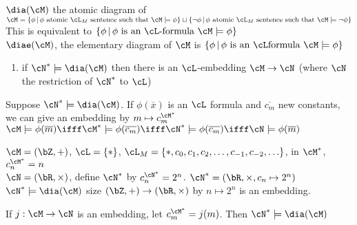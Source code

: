 \begin{definition}
   $\dia(\cM)$ the atomic diagram of $\cM = \{ \phi \, | \, \phi \text{ atomic } \cL_M \text{ sentence such that } \cM \models \phi \} \cup \{ \neg \phi \, | \, \phi \text{ atomic } \cL_M \text{ sentence such that }\cM \models \neg \phi \}$\\ 
   This is equivalent to $\{ \phi \, | \, \phi \text{ is an } \cL\text{-formula } \cM \models \phi\}$ \\
   $\diae(\cM)$, the elementary diagram of $\cM$ is $\{ \phi \, | \, \phi \text{ is an } \cL \text{formula } \cM \models \phi\}$  
\end{definition}

\begin{lemma}
    \begin{enumerate}[label = (\roman*)]
        \item if $\cN^* \models \dia(\cM)$ then there is an $\cL$-embedding $\cM \to \cN$ (where $\cN$ the restriction of $\cN^*$ to $\cL$)
    \end{enumerate}
\end{lemma}

\begin{pf}
    Suppose $\cN^* \models \dia(\cM)$. If $\phi(\overline{x})$ is an $\cL$ formula and $\overline{c_m}$ new constants, we can give an embedding by $m \mapsto c_m^{\cM^*}$ \\ 
    $\cM \models \phi(\overline{m}) \ifff \cM^* \models \phi(\overline{c_m}) \ifff \cN^* \models \phi(\overline{c_m}) \ifff \cN \models \phi(\overline{m})$ 
\end{pf}

\begin{example}
    $\cM = (\bZ, +)$, $\cL = \{*\}$, $\cL_M = \{*, c_0, c_1, c_2, \ldots, c_{-1}, c_{-2}, \ldots\}$, in $\cM^*$, $c_n^{\cM^*} = n$\\
    $\cN = (\bR, \times)$, define $\cN^*$ by $c_n^{\cN^*} = 2^n$. $\cN^* = (\bR, \times, c_n \mapsto 2^n)$ \\
    $\cN^* \models \dia(\cM)$ size $(\bZ, +) \to (\bR, \times)$ by $n \mapsto 2^n$ is an embedding. 
\end{example}

\noindent
If $j: \cM \to \cN$ is an embedding, let $c_m^{\cM^*} = j(m)$. Then $\cN^* \models \dia (\cM)$ 
